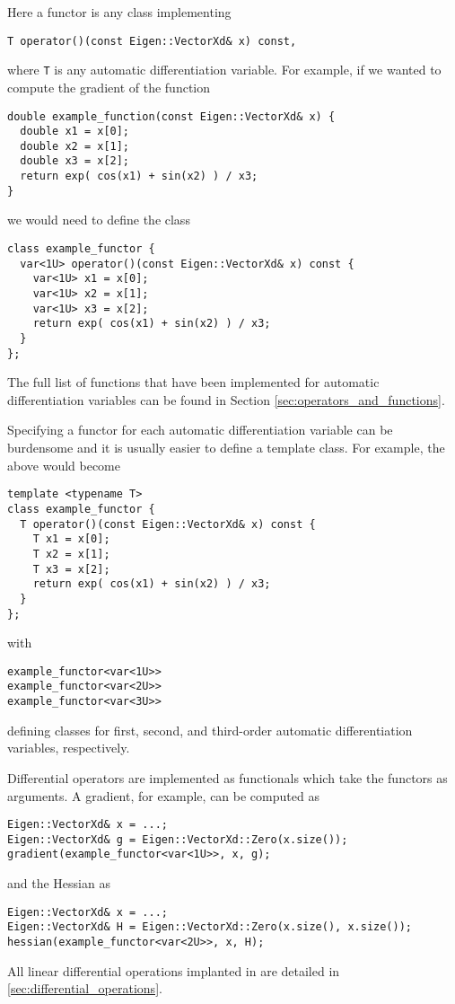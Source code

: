 Here a functor is any class implementing
%
\begin{verbatim}
T operator()(const Eigen::VectorXd& x) const,
\end{verbatim}
%
where \verb|T| is any automatic differentiation variable.  For example,
if we wanted to compute the gradient of the function
%
\begin{verbatim}
double example_function(const Eigen::VectorXd& x) {
  double x1 = x[0];
  double x2 = x[1];
  double x3 = x[2];
  return exp( cos(x1) + sin(x2) ) / x3;
}
\end{verbatim}
%
we would need to define the class
%
\begin{verbatim}
class example_functor {
  var<1U> operator()(const Eigen::VectorXd& x) const {
    var<1U> x1 = x[0];
    var<1U> x2 = x[1];
    var<1U> x3 = x[2];
    return exp( cos(x1) + sin(x2) ) / x3;
  }
};
\end{verbatim}
%
The full list of functions that have been implemented for automatic
differentiation variables can be found in Section \ref{sec:operators_and_functions}.

Specifying a functor for each automatic differentiation variable can be
burdensome and it is usually easier to define a template class.  For
example, the above would become
%
\begin{verbatim}
template <typename T>
class example_functor {
  T operator()(const Eigen::VectorXd& x) const {
    T x1 = x[0];
    T x2 = x[1];
    T x3 = x[2];
    return exp( cos(x1) + sin(x2) ) / x3;
  }
};
\end{verbatim}
%
with
%
\begin{verbatim}
example_functor<var<1U>>
example_functor<var<2U>>
example_functor<var<3U>>
\end{verbatim}
%
defining classes for first, second, and third-order automatic differentiation
variables, respectively.

Differential operators are implemented as functionals which take
the functors as arguments.  A gradient, for example, can be computed
as
%
\begin{verbatim}
Eigen::VectorXd& x = ...;
Eigen::VectorXd& g = Eigen::VectorXd::Zero(x.size());
gradient(example_functor<var<1U>>, x, g);
\end{verbatim}
%
and the Hessian as
%
\begin{verbatim}
Eigen::VectorXd& x = ...;
Eigen::VectorXd& H = Eigen::VectorXd::Zero(x.size(), x.size());
hessian(example_functor<var<2U>>, x, H);
\end{verbatim}
%
All linear differential operations implanted in \nomad are detailed in \ref{sec:differential_operations}.

